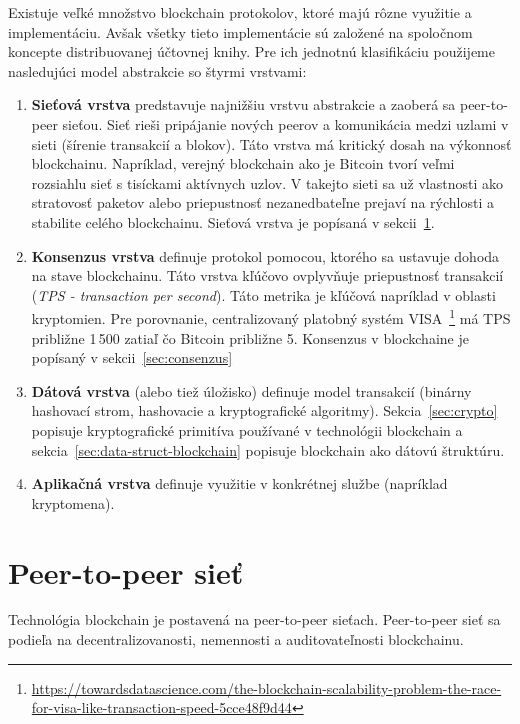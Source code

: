 Existuje veľké množstvo blockchain protokolov, ktoré majú rôzne využitie a implementáciu. Avšak všetky tieto implementácie sú založené na spoločnom koncepte distribuovanej účtovnej knihy. Pre ich jednotnú klasifikáciu použijeme nasledujúci model abstrakcie so štyrmi vrstvami:~\cite{homoliakBlockchain}

\begin{enumerate}
	\item \textbf{Sieťová vrstva} predstavuje najnižšiu vrstvu abstrakcie a zaoberá sa peer-to-peer sieťou. Sieť rieši pripájanie nových peerov a komunikácia medzi uzlami v sieti (šírenie transakcií a blokov). Táto vrstva má kritický dosah na výkonnosť blockchainu. Napríklad, verejný blockchain ako je Bitcoin tvorí veľmi rozsiahlu sieť s tisíckami aktívnych uzlov. V takejto sieti sa už vlastnosti ako stratovosť paketov alebo priepustnosť nezanedbateľne prejaví na rýchlosti a stabilite celého blockchainu. Sieťová vrstva je popísaná v sekcii~\ref{sec:p2p}.~\cite{fanPerfEval}
	\item \textbf{Konsenzus vrstva} definuje protokol pomocou, ktorého sa ustavuje dohoda na stave blockchainu. Táto vrstva kľúčovo ovplyvňuje priepustnosť transakcií (\textit{TPS - transaction per second}). Táto metrika je kľúčová napríklad v oblasti kryptomien. Pre porovnanie, centralizovaný platobný systém VISA~\footnote{\url{https://towardsdatascience.com/the-blockchain-scalability-problem-the-race-for-visa-like-transaction-speed-5cce48f9d44}} má TPS približne 1\,500 zatiaľ čo Bitcoin približne 5. Konsenzus v blockchaine je popísaný v sekcii~\ref{sec:consenzus}
	\item \textbf{Dátová vrstva} (alebo tiež úložisko) definuje model transakcií (binárny hashovací strom, hashovacie a kryptografické algoritmy). Sekcia~\ref{sec:crypto} popisuje kryptografické primitíva používané v technológii blockchain a sekcia~\ref{sec:data-struct-blockchain} popisuje blockchain ako dátovú štruktúru.
	\item \textbf{Aplikačná vrstva} definuje využitie v konkrétnej službe (napríklad kryptomena).
\end{enumerate}

\section{Peer-to-peer sieť}\label{sec:p2p}

Technológia blockchain je postavená na peer-to-peer sieťach. Peer-to-peer sieť sa podieľa na decentralizovanosti, nemennosti a auditovateľnosti blockchainu. 

